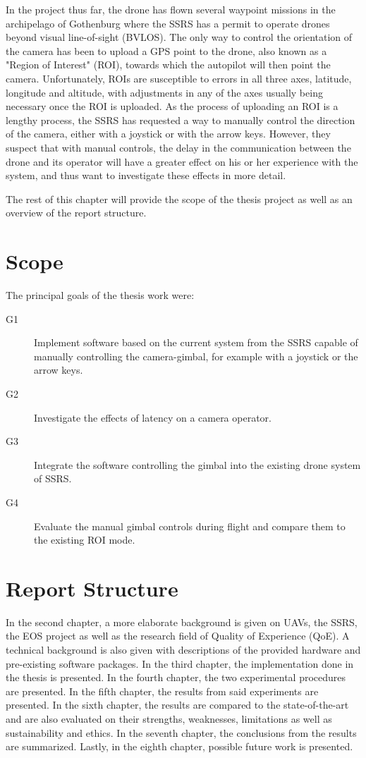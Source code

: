 \documentclass[nofilelist]{cslthse-msc}
\begin{document}
In the project thus far, the drone has flown several waypoint missions in the archipelago of Gothenburg where the SSRS has a permit to operate drones beyond visual line-of-sight (BVLOS). The only way to control the orientation of the camera has been to upload a GPS point to the drone, also known as a "Region of Interest" (ROI), towards which the autopilot will then point the camera. Unfortunately, ROIs are susceptible to errors in all three axes, latitude, longitude and altitude, with adjustments in any of the axes usually being necessary once the ROI is uploaded. As the process of uploading an ROI is a lengthy process, the SSRS has requested a way to manually control the direction of the camera, either with a joystick or with the arrow keys. However, they suspect that with manual controls, the delay in the communication between the drone and its operator will have a greater effect on his or her experience with the system, and thus want to investigate these effects in more detail.

The rest of this chapter will provide the scope of the thesis project as well as an overview of the report structure.

\section{Scope}
\label{sec:scope}
The principal goals of the thesis work were:
\begin{description}
   \item[G1] Implement software based on the current system from the SSRS capable of manually controlling the camera-gimbal, for example with a joystick or the arrow keys. 
   \item[G2] Investigate the effects of latency on a camera operator. 
   \item[G3] Integrate the software controlling the gimbal into the existing drone system of SSRS.
   \item[G4] Evaluate the manual gimbal controls during flight and compare them to the existing ROI mode.
\end{description}

\section{Report Structure}
In the second chapter, a more elaborate background is given on UAVs, the SSRS, the EOS project as well as the research field of Quality of Experience (QoE). A technical background is also given with descriptions of the provided hardware and pre-existing software packages. In the third chapter, the implementation done in the thesis is presented. In the fourth chapter, the two experimental procedures are presented. In the fifth chapter, the results from said experiments are presented. In the sixth chapter, the results are compared to the state-of-the-art and are also evaluated on their strengths, weaknesses, limitations as well as sustainability and ethics. In the seventh chapter, the conclusions from the results are summarized. Lastly, in the eighth chapter, possible future work is presented.
\end{document}
